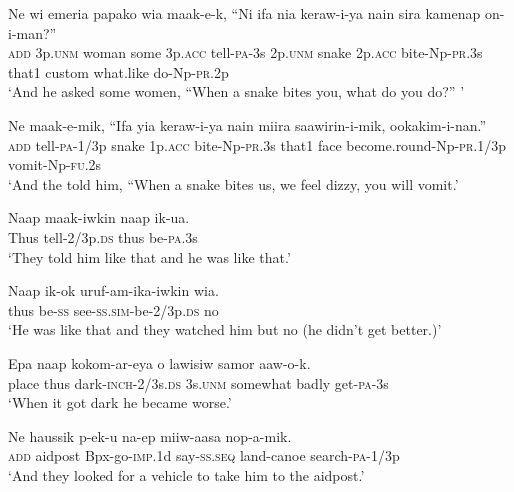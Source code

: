 \ea
\gll  Ne  wi  emeria  papako  wia  maak-e-k,  “Ni  ifa       nia  keraw-i-ya  nain  sira  kamenap  on-i-man?” \\
\textsc{add}  3p.\textsc{unm}  woman  some  3p.\textsc{acc}  tell-\textsc{pa}-3s  2p.\textsc{unm}  snake  2p.\textsc{acc}  bite-Np-\textsc{pr}.3s  that1  custom  what.like  do-Np-\textsc{pr}.2p \\


\glt ‘And he asked some women, “When a snake bites you, what do you do?” ’ \\
\z


\ea
\gll  Ne  maak-e-mik,  “Ifa  yia  keraw-i-ya  nain      miira  saawirin-i-mik,  ookakim-i-nan.” \\
\textsc{add}  tell-\textsc{pa}-1/3p  snake  1p.\textsc{acc}  bite-Np-\textsc{pr}.3s  that1  face  become.round-Np-\textsc{pr}.1/3p  vomit-Np-\textsc{fu}.2s \\


\glt ‘And the told him, “When a snake bites us, we feel dizzy, you will vomit.’ \\
\z


\ea
\gll  Naap  maak-iwkin  naap  ik-ua. \\
Thus  tell-2/3p.\textsc{ds}  thus  be-\textsc{pa}.3s \\
\glt ‘They told him like that and he was like that.’ \\
\z


\ea
\gll  Naap  ik-ok  uruf-am-ika-iwkin  wia. \\
thus  be-\textsc{ss}  see-\textsc{ss}.\textsc{sim}-be-2/3p.\textsc{ds}  no \\
\glt ‘He was like that and they watched him but no (he didn’t get better.)’ \\
\z


\ea
\gll  Epa  naap  kokom-ar-eya  o  lawisiw  samor         aaw-o-k. \\
place  thus  dark-\textsc{inch}-2/3s.\textsc{ds}  3s.\textsc{unm}  somewhat  badly  get-\textsc{pa}-3s \\


\glt ‘When it got dark he became worse.’ \\
\z


\ea
\gll  Ne  haussik  p-ek-u  na-ep  miiw-aasa  nop-a-mik. \\
\textsc{add}  aidpost  Bpx-go-\textsc{imp}.1d  say-\textsc{ss.seq}  land-canoe  search-\textsc{pa}-1/3p \\
\glt ‘And they looked for a vehicle to take him to the aidpost.’ \\
\z



